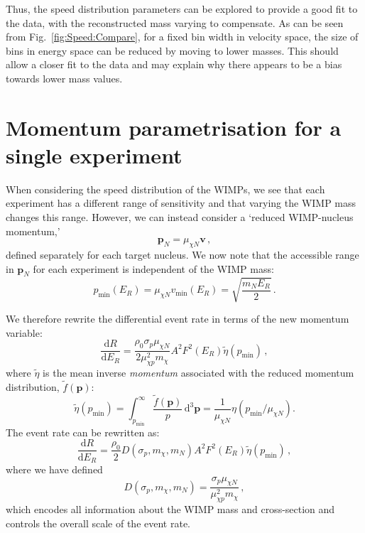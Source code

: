 Thus, the speed distribution parameters can be explored to provide a good fit to the data, with the reconstructed mass varying to compensate. As can be seen from Fig.\ \ref{fig:Speed:Compare}, for a fixed bin width in velocity space, the size of bins in energy space can be reduced by moving to lower masses. This should allow a closer fit to the data and may explain why there appears to be a bias towards lower mass values.


\section{Momentum parametrisation for a single experiment}
\label{sec:Speed:MomentumMethod1}

When considering the speed distribution of the WIMPs, we see that each experiment has a different range of sensitivity and that varying the WIMP mass changes this range. However, we can instead consider a `reduced WIMP-nucleus momentum,'
\begin{equation}
\textbf{p}_N = \mu_{\chi N} \textbf{v} \,,
\end{equation}
defined separately for each target nucleus. We now note that the accessible range in \(\textbf{p}_N\) for each experiment is independent of the WIMP mass:
\begin{equation}
p_\textrm{min}(E_R) = \mu_{\chi N} v_\textrm{min}(E_R) = \sqrt{\frac{m_N E_R}{2}} \,.
\end{equation}

We therefore rewrite the differential event rate in terms of the new momentum variable:
\begin{equation}
\frac{\textrm{d}R}{\textrm{d}E_R} = \frac{\rho_0 \sigma_p \mu_{\chi N}}{2 \mu_{\chi p}^2 m_\chi} A^2 F^2(E_R) \tilde{\eta}(p_{\textrm{min}})\,,
\end{equation}
where \(\tilde{\eta}\) is the mean inverse \textit{momentum} associated with the reduced momentum distribution, \(\tilde{f}(\textbf{p})\):
\begin{equation}
\tilde{\eta}(p_{\textrm{min}}) = \int_{p_{\textrm{min}}}^\infty \frac{\tilde{f}(\textbf{p})}{p}\, \textrm{d}^3\textbf{p} = \frac{1}{\mu_{\chi N}}\eta(p_\textrm{min}/\mu_{\chi N}).
\end{equation}
The event rate can be rewritten as:
\begin{equation}
\frac{\textrm{d}R}{\textrm{d}E_R} = \frac{\rho_0}{2} D(\sigma_p,m_\chi,m_N) A^2 F^2(E_R) \tilde{\eta}(p_{\textrm{min}}) \,,
\end{equation}
where we have defined
\begin{equation}
D(\sigma_p,m_\chi,m_N) = \frac{\sigma_p \mu_{\chi N}}{\mu_{\chi p}^2 m_\chi} \,,
\end{equation}
which encodes all information about the WIMP mass and cross-section and controls the overall scale of the event rate.

